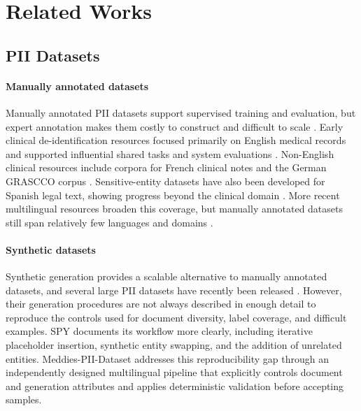 \documentclass[11pt]{article}
\begin{document}
\section{Related Works}

\subsection{PII Datasets}

\paragraph{Manually annotated datasets} Manually annotated PII datasets support supervised training and evaluation, but expert annotation makes them costly to construct and difficult to scale \cite{deleger2014preparing}. Early clinical de-identification resources focused primarily on English medical records and supported influential shared tasks and system evaluations \cite{neamatullah2008automated,uzuner2007evaluating,stubbs2015automated}. Non-English clinical resources include corpora for French clinical notes and the German GRASCCO corpus \cite{grouin2014identification,modersohn2022grascco}. Sensitive-entity datasets have also been developed for Spanish legal text, showing progress beyond the clinical domain \cite{de-gibert-bonet-etal-2022-spanish}. More recent multilingual resources broaden this coverage, but manually annotated datasets still span relatively few languages and domains \cite{baroud2026multigrascco}.

\paragraph{Synthetic datasets} Synthetic generation provides a scalable alternative to manually annotated datasets, and several large PII datasets have recently been released \cite{ai4privacy_openpii_1_5m_2026,gretel-pii-docs-en-v1,nemotron-pii}. However, their generation procedures are not always described in enough detail to reproduce the controls used for document diversity, label coverage, and difficult examples. SPY \cite{savkin-etal-2025-spy} documents its workflow more clearly, including iterative placeholder insertion, synthetic entity swapping, and the addition of unrelated entities. Meddies-PII-Dataset addresses this reproducibility gap through an independently designed multilingual pipeline that explicitly controls document and generation attributes and applies deterministic validation before accepting samples.
\end{document}
